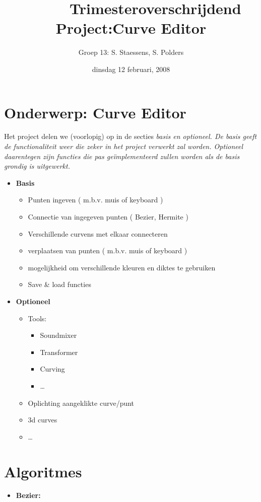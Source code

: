 \documentclass[a4paper,11pt,oneside, titlepage]{article}
\author{ Groep 13: S. Staessens, S. Polders }
\title{\ \ \ \ \ \ Trimesteroverschrijdend Project:\newline Curve Editor}
\date{dinsdag 12 februari, 2008}
\begin{document}
\maketitle\newpage
\section{Onderwerp: Curve Editor}
Het project delen we (voorlopig) op in de secties \it{basis} en \it{optioneel}. 
\rm{De basis geeft de functionaliteit weer die zeker in het project verwerkt zal worden. Optioneel
daarentegen zijn functies die pas ge\"implementeerd zullen worden als de basis grondig is 
uitgewerkt.}
\begin{itemize}
\item \bf{Basis}
\begin{itemize}
\item \rm{Punten ingeven ( m.b.v. muis of keyboard )}
\item Connectie van ingegeven punten ( Bezier, Hermite )
\item Verschillende curvens met elkaar connecteren
\item verplaatsen van punten ( m.b.v. muis of keyboard )
\item mogelijkheid om verschillende kleuren en diktes te gebruiken
\item Save \& load functies
\end{itemize}
\item \bf{Optioneel}
\begin{itemize}
\item \rm{Tools:}
\begin{itemize}
\item Soundmixer
\item Transformer
\item Curving
\item \ldots
\end{itemize}
\item Oplichting aangeklikte curve/punt
\item 3d curves
\item \ldots
\end{itemize}
\end{itemize}
\section{Algoritmes}
\begin{itemize}
\item \bf{Bezier:}\newline
{}
\end{itemize}
\end{document}
